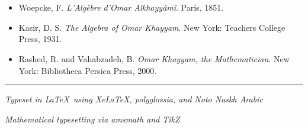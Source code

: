 \documentclass[11pt,a4paper]{book}
\begin{document}
\clearpage

\section*{}


\begin{itemize}[noitemsep]
\item Woepcke, F. \textit{L'Algèbre d'Omar Alkhayyâmî}. Paris, 1851.
\item Kasir, D. S. \textit{The Algebra of Omar Khayyam}. New York: Teachers College Press, 1931.
\item Rashed, R. and Vahabzadeh, B. \textit{Omar Khayyam, the Mathematician}. New York: Bibliotheca Persica Press, 2000.
\end{itemize}



\vspace{1cm}

\begin{center}
{\color{rulecolor}\rule{0.4\textwidth}{0.4pt}}

\vspace{0.5cm}

{\footnotesize\textit{Typeset in \LaTeX\ using XeLaTeX, polyglossia, and Noto Naskh Arabic}}

{\footnotesize\textit{Mathematical typesetting via amsmath and TikZ}}
\end{center}
\end{document}

